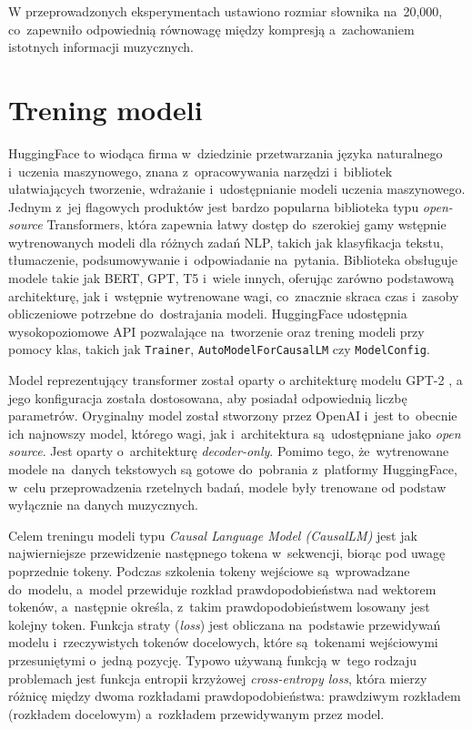 \documentclass[data-science]{agh-wi} %
\begin{document}
W przeprowadzonych eksperymentach ustawiono rozmiar słownika na~20,000, co~zapewniło odpowiednią równowagę między kompresją a~zachowaniem istotnych informacji muzycznych.

\section{Trening modeli}
HuggingFace to wiodąca firma w~dziedzinie przetwarzania języka naturalnego i~uczenia maszynowego, znana z~opracowywania narzędzi i~bibliotek ułatwiających tworzenie, wdrażanie i~udostępnianie modeli uczenia maszynowego. Jednym z~jej flagowych produktów jest bardzo popularna biblioteka typu \textit{open-source} Transformers, która zapewnia łatwy dostęp do~szerokiej gamy wstępnie wytrenowanych modeli dla różnych zadań NLP, takich jak klasyfikacja tekstu, tłumaczenie, podsumowywanie i~odpowiadanie na~pytania. Biblioteka obsługuje modele takie jak BERT, GPT, T5 i~wiele innych, oferując zarówno podstawową architekturę, jak i~wstępnie wytrenowane wagi, co~znacznie skraca czas i~zasoby obliczeniowe potrzebne do~dostrajania modeli. HuggingFace udostępnia wysokopoziomowe API pozwalające na~tworzenie oraz trening modeli przy pomocy klas, takich jak \texttt{Trainer}, \texttt{AutoModelForCausalLM} czy \texttt{ModelConfig}.

Model reprezentujący transformer został oparty o architekturę modelu GPT-2 \cite*{gpt2}, a jego konfiguracja została dostosowana, aby posiadał odpowiednią liczbę parametrów. Oryginalny model został stworzony przez OpenAI i~jest to~obecnie ich najnowszy model, którego wagi, jak i~architektura są~udostępniane jako \textit{open source}. Jest oparty o~architekturę \textit{decoder-only}. Pomimo tego, że~wytrenowane modele na~danych tekstowych są gotowe do~pobrania z~platformy HuggingFace, w~celu przeprowadzenia rzetelnych badań, modele były trenowane od podstaw wyłącznie na danych muzycznych.

Celem treningu modeli typu \textit{Causal Language Model (CausalLM)} jest jak najwierniejsze przewidzenie następnego tokena w~sekwencji, biorąc pod uwagę poprzednie tokeny. Podczas szkolenia tokeny wejściowe są~wprowadzane do~modelu, a~model przewiduje rozkład prawdopodobieństwa nad wektorem tokenów, a~następnie określa, z~takim prawdopodobieństwem losowany jest kolejny token. Funkcja straty (\textit{loss}) jest obliczana na~podstawie przewidywań modelu i~rzeczywistych tokenów docelowych, które są~tokenami wejściowymi przesuniętymi o~jedną pozycję. Typowo używaną funkcją w~tego rodzaju problemach jest funkcja entropii krzyżowej \textit{cross-entropy loss}, która mierzy różnicę między dwoma rozkładami prawdopodobieństwa: prawdziwym rozkładem (rozkładem docelowym) a~rozkładem przewidywanym przez model.
\end{document}
